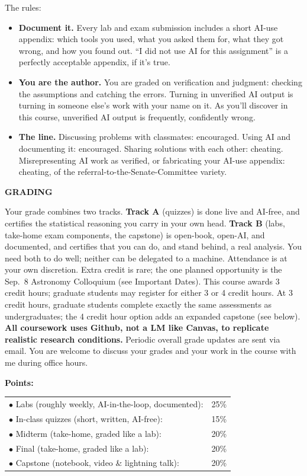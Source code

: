 The rules:
\begin{itemize}
    \setlength\itemsep{0.05em}
    \item {\bf Document it.} Every lab and exam submission includes a short AI-use
        appendix: which tools you used, what you asked them for, what they got
        wrong, and how you found out. ``I did not use AI for this assignment''
        is a perfectly acceptable appendix, if it's true.
    \item {\bf You are the author.} You are graded on verification and judgment:
        checking the assumptions and catching the errors. Turning in unverified AI output
        is turning in someone else's work with your name on it. As
        you'll discover in this course, unverified AI output is frequently,
        confidently wrong.
    \item {\bf The line.} Discussing problems with classmates: encouraged.
        Using AI and documenting it: encouraged. Sharing solutions with each
        other: cheating. Misrepresenting AI work as verified, or fabricating
        your AI-use appendix: cheating, of the referral-to-the-Senate-Committee
        variety.
\end{itemize}

{\large \bf \headerfont \color{RoyalBlue} GRADING}

Your grade combines two tracks. {\bf Track A} (quizzes) is
done live and AI-free, and certifies the statistical reasoning you carry in
your own head. {\bf Track B} (labs, take-home exam components, the capstone) is
open-book, open-AI, and documented, and certifies that you can do, and stand
behind, a real analysis. You need both to do well; neither can be delegated
to a machine. Attendance is at your own discretion. Extra credit is rare;
the one planned opportunity is the Sep.~8 Astronomy Colloquium (see Important
Dates). This course awards 3 credit hours; graduate students may register for either
3 or 4 credit hours. At 3 credit hours, graduate students complete exactly the
same assessments as undergraduates; the 4 credit hour option adds an expanded
capstone (see below). {\bf All
coursework uses Github, not a LM like Canvas, to replicate realistic research
conditions.} Periodic overall grade updates are sent via email. You are
welcome to discuss your grades and your work in the course with me during
office hours.\smallskip

{\bf \headerfont \color{RoyalBlue} Points:}
\begin{tabular}{ll}
$\bullet$ Labs (roughly weekly, AI-in-the-loop, documented): & 25\% \\
$\bullet$ In-class quizzes (short, written, AI-free): & 15\% \\
$\bullet$ Midterm (take-home, graded like a lab): & 20\% \\
$\bullet$ Final (take-home, graded like a lab): & 20\% \\
$\bullet$ Capstone (notebook, video \& lightning talk): & 20\% \\
\end{tabular}

